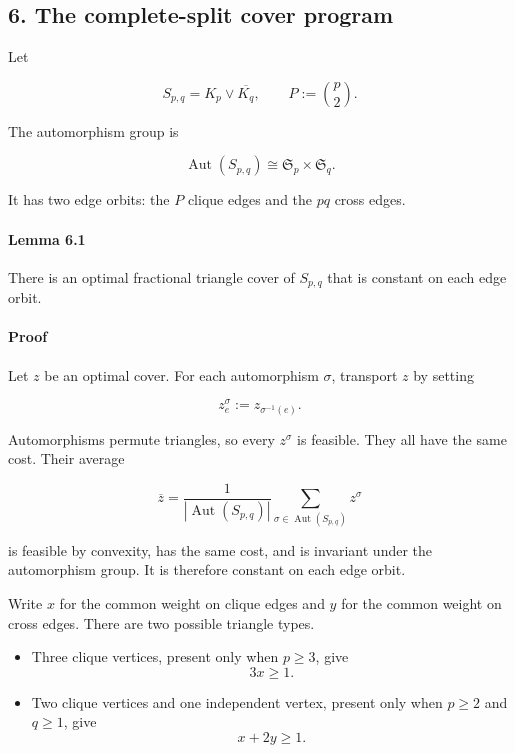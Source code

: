 \documentclass[english,11pt,a4paper]{article}
\providecommand{\tightlist}{\setlength{\itemsep}{0pt}\setlength{\parskip}{0pt}}
\begin{document}
\subsection{6. The complete-split cover
program}\label{the-complete-split-cover-program}

Let

\[
S_{p,q}=K_p\vee\overline{K_q},
\qquad
P:=\binom p2.
\]

The automorphism group is

\[
\operatorname{Aut}(S_{p,q})
\cong
\mathfrak S_p\times\mathfrak S_q.
\]

It has two edge orbits: the \(P\) clique edges and the \(pq\) cross
edges.

\paragraph{Lemma 6.1}\label{lemma-6.1}

There is an optimal fractional triangle cover of \(S_{p,q}\) that is
constant on each edge orbit.

\paragraph{Proof}\label{proof-8}

Let \(z\) be an optimal cover. For each automorphism \(\sigma\),
transport \(z\) by setting

\[
z^\sigma_e:=z_{\sigma^{-1}(e)}.
\]

Automorphisms permute triangles, so every \(z^\sigma\) is feasible. They
all have the same cost. Their average

\[
\overline z
=
\frac{1}{|\operatorname{Aut}(S_{p,q})|}
\sum_{\sigma\in\operatorname{Aut}(S_{p,q})}z^\sigma
\]

is feasible by convexity, has the same cost, and is invariant under the
automorphism group. It is therefore constant on each edge orbit.

Write \(x\) for the common weight on clique edges and \(y\) for the
common weight on cross edges. There are two possible triangle types.

\begin{itemize}
\tightlist
\item
  Three clique vertices, present only when \(p\ge3\), give \[
  3x\ge1.
  \]
\item
  Two clique vertices and one independent vertex, present only when
  \(p\ge2\) and \(q\ge1\), give \[
  x+2y\ge1.
  \]
\end{itemize}
\end{document}
